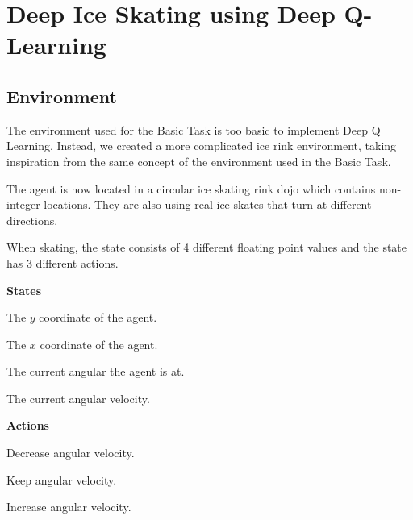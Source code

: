 \renewcommand{\thesection}{Advanced Task}
\section{Deep Ice Skating using Deep Q-Learning}
\subsection{Environment}
The environment used for the Basic Task is too basic to implement Deep Q Learning. Instead, we created a more complicated ice rink environment, taking inspiration from the  same concept of the environment used in the Basic Task.

The agent is now located in a circular ice skating rink dojo which contains non-integer locations.
They are also using real ice skates that turn at different directions.

When skating, the state consists of 4 different floating point values and the state has 3 different actions.

\begin{center}
	\begin{minipage}[t]{.48\textwidth}
		\begin{center}
			\textbf{States}
		\end{center}
		\begin{description}[noitemsep,style=nextline]
			\item[\bm{$y$}] The $y$ coordinate of the agent.
			\item[\bm{$x$}] The $x$ coordinate of the agent.
			\item[\bm{$\varphi$}] The current angular the agent is at.
			\item[\bm{$\theta$}] The current angular velocity.
		\end{description}
	\end{minipage}
	\begin{minipage}[t]{.48\textwidth}
		\begin{center}
			\textbf{Actions}
		\end{center}
		\begin{description}[noitemsep]
			\item[0. Turn Left] Decrease angular velocity.
			\item[1. Stay Put] Keep angular velocity.
			\item[2. Turn Right] Increase angular velocity.
		\end{description}
	\end{minipage}
\end{center}

